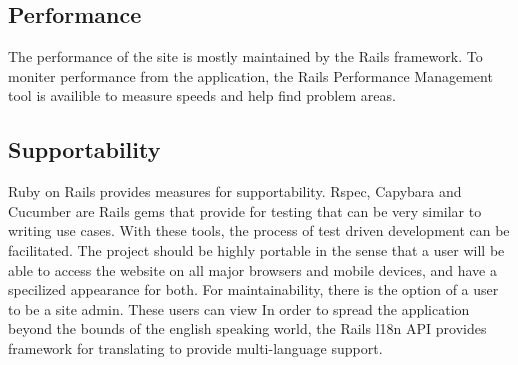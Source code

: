 \subsection{Performance}
The performance of the site is mostly maintained by the Rails framework. To moniter performance from the application, the Rails Performance Management tool is availible to measure speeds and help find problem areas.


\subsection{Supportability}
Ruby on Rails provides measures for supportability. Rspec, Capybara and Cucumber are Rails gems that provide for testing that can be very similar to writing use cases. With these tools, the process of test driven development can be facilitated. 
The project should be highly portable in the sense that a user will be able to access the website on all major browsers and mobile devices, and have a specilized appearance for both. 
For maintainability, there is the option of a user to be a site admin. These users can view 
In order to spread the application beyond the bounds of the english speaking world, the Rails l18n API provides framework for translating to provide multi-language support.
